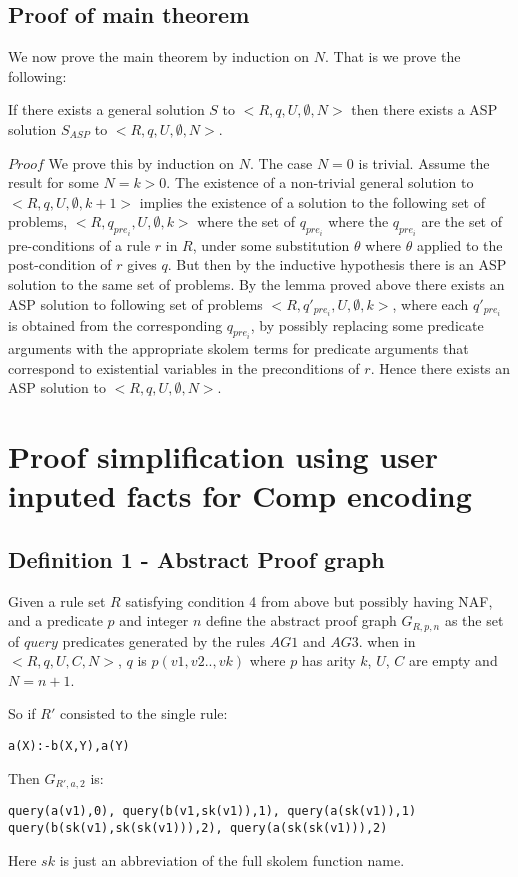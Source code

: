 \documentclass[sigconf]{acmart}
\begin{document}
\subsection{Proof of main theorem}
We now prove the main theorem by induction on $N$. That is we prove the following:\\
\begin{theorem}[Completeness]\label{completeness}If there exists a general solution $S$ to $<R,q,U,\emptyset,N>$ then there exists a ASP solution $S_{ASP}$ to $<R,q,U,\emptyset,N>$.
\end{theorem}
$Proof$ We prove this by induction on $N$. The case $N=0$ is trivial. Assume the result for some $N=k>0$. The existence of a non-trivial general solution to $<R,q,U,\emptyset,k+1>$ implies the existence of a solution to the following set of problems, $<R,q_{pre_{i}},U,\emptyset,k>$ where the set of $q_{pre_{i}}$ where the $q_{pre_{i}}$ are the set of pre-conditions of a rule $r$ in $R$, under some substitution $\theta$ where $\theta$ applied to the post-condition of $r$ gives $q$. But then by the inductive hypothesis there is an ASP solution to the same set of problems. By the lemma proved above there exists an ASP solution to following set of problems $<R,q'_{pre_{i}},U,\emptyset,k>$, where each $q'_{pre_{i}}$ is obtained from the corresponding $q_{pre_{i}}$, by possibly replacing some predicate arguments with the appropriate skolem terms for predicate arguments that correspond to existential variables in the preconditions of $r$. Hence there exists an ASP solution to $<R,q,U,\emptyset,N>$.

\section{Proof simplification using user inputed facts for Comp encoding}\label{sec:proof_simplification}
\subsection{Definition 1 - Abstract Proof graph}
Given a rule set $R$ satisfying condition 4 from above but possibly having NAF, and a predicate $p$ and integer $n$ define the abstract proof graph $G_{R,p,n}$ as the set of $query$ predicates generated by the rules $AG1$ and $AG3$. when in $<R,q,U,C,N>$, $q$ is $p(v1,v2..,vk)$ where $p$ has arity $k$, $U$, $C$ are empty and $N = n+1$. 

So if $R'$ consisted to the single rule:
\begin{verbatim}
a(X):-b(X,Y),a(Y)
\end{verbatim}
Then $G_{R',a,2}$ is:
\begin{verbatim}
query(a(v1),0), query(b(v1,sk(v1)),1), query(a(sk(v1)),1)
query(b(sk(v1),sk(sk(v1))),2), query(a(sk(sk(v1))),2) \end{verbatim}
Here $sk$ is just an abbreviation of the full skolem function name. 
\end{document}
